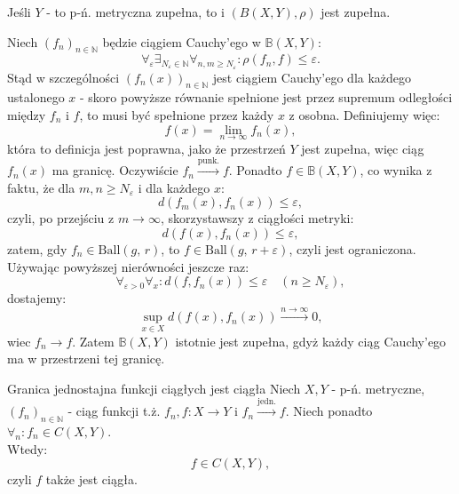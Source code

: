 \documentclass{article}
\newcounter{defi}
\numberwithin{defi}{section}
\numberwithin{defi}{section}
\newcommand{\N}{\mathbb{N}}
\newcommand{\B}{\mathbb{B}}
\newcommand{\oo}{\infty}
\providecommand{\eps}{\varepsilon}
\renewcommand{\geq}{\geqslant}
\renewcommand{\leq}{\leqslant}
\newcommand{\ciag}[1]{(#1_{n})_{n \in \N}}
\newcommand{\ball}[2]{\text{Ball}(#1, \, #2)}
\newcommand{\topunk}{\xrightarrow{\text{punk.}}}
\newcommand{\tojedn}{\xrightarrow{\text{jedn.}}}
\begin{document}
\begin{twier}[label=twier:zb-jedn-zb]{}
    Jeśli $Y$ - to p-ń. metryczna zupełna, to i $(B(X, Y), \rho)$ jest zupełna.
\end{twier}

\begin{dow}{}
    Niech $\ciag{f}$ będzie ciągiem Cauchy'ego w $\B(X, Y)$: \begin{equation*}
        \forall_{\eps} \exists_{N_\eps \in \N} \forall_{n, m \geq N_\eps}: \rho(f_n, f) \leq \eps.
    \end{equation*} Stąd w szczególności $(f_n(x))_{n \in \N}$ jest ciągiem Cauchy'ego dla każdego ustalonego $x$ - skoro powyższe równanie spełnione jest przez supremum odległości między $f_n$ i $f$, to musi być spełnione przez każdy $x$ z osobna. Definiujemy więc:\begin{equation*}
        f(x) = \lim_{n \to \oo} f_n(x),
    \end{equation*} która to definicja jest poprawna, jako że przestrzeń $Y$ jest zupełna, więc ciąg $f_n(x)$ ma granicę. Oczywiście $f_n \topunk f$. Ponadto $f \in \B(X, Y)$, co wynika z faktu, że dla $m, n \geq N_\eps$ i dla każdego $x$: \begin{equation*}
        d(f_m(x), f_n(x) ) \leq \eps,
    \end{equation*} czyli, po przejściu z $m \to \oo$, skorzystawszy z ciągłości metryki: \begin{equation*}
        d(f(x), f_n(x) ) \leq \eps,
    \end{equation*} zatem, gdy $f_n \in \ball{g}{r}$, to $f \in \ball{g}{r + \eps}$, czyli jest ograniczona. Używając powyższej nierówności jeszcze raz: \begin{equation}
        \forall_{\eps > 0} \forall_{x}: d(f, f_n(x)) \leq \eps \quad (n \geq N_\eps),
    \end{equation} dostajemy: \begin{equation}
        \sup_{x \in X} d(f(x), f_n(x)) \xrightarrow[]{n \to \oo} 0,
    \end{equation} wiec $f_n \to f$. Zatem $\B(X, Y)$ istotnie jest zupełna, gdyż każdy ciąg Cauchy'ego ma w przestrzeni tej granicę.
\end{dow}


\begin{twier}{Granica jednostajna funkcji ciągłych jest ciągła}
    Niech $X, Y$ - p-ń. metryczne, $\ciag{f}$ - ciąg funkcji t.ż. $f_n, f: X \to Y$ i $f_n \tojedn f$. Niech ponadto $\forall_n: f_n \in C(X, Y)$. \\
    Wtedy: \begin{equation}
        f \in C(X, Y),
    \end{equation} czyli $f$ także jest ciągła.
\end{twier}
\end{document}
